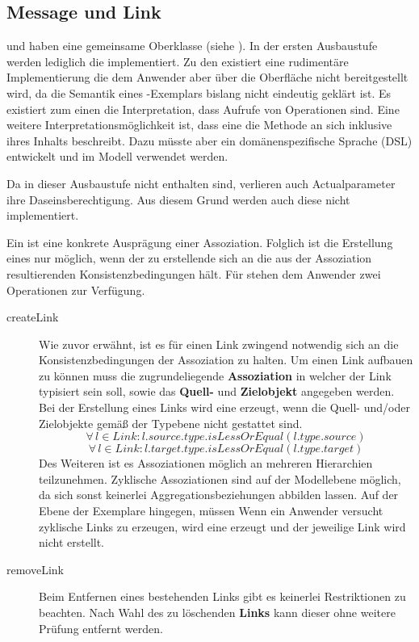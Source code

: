 \subsection{Message und Link}\label{Message:Message}

 und  haben eine gemeinsame Oberklasse  (siehe ). 
In der ersten Ausbaustufe werden lediglich die  implementiert. Zu den  existiert eine rudimentäre
Implementierung die dem Anwender aber über die Oberfläche nicht bereitgestellt wird, da die Semantik eines -Exemplars bislang nicht eindeutig geklärt ist.
Es existiert zum einen die Interpretation, dass  Aufrufe von Operationen sind. 
Eine weitere Interpretationsmöglichkeit ist, dass eine  die Methode an sich inklusive ihres Inhalts beschreibt. 
Dazu müsste aber ein domänenspezifische Sprache (DSL) entwickelt und im Modell verwendet werden.

Da  in dieser Ausbaustufe nicht enthalten sind, verlieren auch Actualparameter ihre Daseinsberechtigung. 
Aus diesem Grund werden auch diese nicht implementiert.

Ein  ist eine konkrete Ausprägung einer Assoziation. Folglich ist die Erstellung eines  nur möglich, 
wenn der zu erstellende  sich an die aus der Assoziation resultierenden Konsistenzbedingungen hält. 
Für  stehen dem Anwender zwei Operationen zur Verfügung.

\begin{description}
\item[createLink]
Wie zuvor erwähnt, ist es für einen Link zwingend notwendig sich an die Konsistenzbedingungen der Assoziation zu halten. Um einen Link aufbauen zu können muss die zugrundeliegende  \textbf{Assoziation} in welcher der Link typisiert sein soll, sowie das \textbf{Quell-} und \textbf{Zielobjekt} angegeben werden.
Bei der Erstellung eines Links wird eine  erzeugt, wenn die Quell- und/oder Zielobjekte gemäß der Typebene nicht 
gestattet sind.
\begin{equation} \forall \, l \in Link: l.source.type.isLessOrEqual(l.type.source)
\end{equation} 
\begin{equation} \forall \, l \in Link: l.target.type.isLessOrEqual(l.type.target)
\end{equation}
Des Weiteren ist es Assoziationen möglich an mehreren Hierarchien teilzunehmen. Zyklische Assoziationen sind auf der Modellebene möglich, 
da sich sonst keinerlei Aggregationsbeziehungen abbilden lassen.
Auf der Ebene der Exemplare hingegen, müssen 
Wenn ein Anwender versucht zyklische Links zu erzeugen, wird eine  erzeugt und der jeweilige Link wird nicht erstellt.
\item[removeLink]
Beim Entfernen eines bestehenden Links gibt es keinerlei Restriktionen zu beachten. Nach Wahl des zu löschenden \textbf{Links} kann dieser ohne weitere Prüfung entfernt werden.
\end{description}